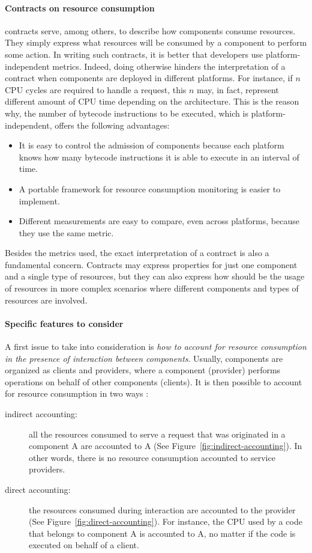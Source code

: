 \paragraph{Contracts on resource consumption}
 contracts serve, among others, to describe how components consume resources.
They simply express what resources will be consumed by a component to perform some action. 
In writing such contracts, it is better that developers use platform-independent metrics.
Indeed, doing otherwise hinders the interpretation of a contract when components are deployed in different platforms.
For instance, if $n$ CPU cycles are required to handle a request, this $n$ may, in fact, represent different amount of CPU time depending on the architecture.
This is the reason why, the number of bytecode instructions to be executed, which is platform-independent, offers the following advantages:
\begin{itemize}
\item It is easy to control the admission of components because each platform knows how many bytecode instructions it is able to execute in an interval of time.
\item A portable framework for resource consumption monitoring is easier to implement.
\item Different measurements are easy to compare, even across platforms, because they use the same metric.
\end{itemize}
Besides the metrics used, the exact interpretation of a contract is also a fundamental concern.
Contracts may express properties for just one component and a single type of resources, but they can also express how should be the usage of resources in more complex scenarios where different components and types of resources are involved.

\paragraph{Specific features to consider}
A first issue to take into consideration is \textit{how to account for resource consumption in the presence of interaction between components}.
Usually, components are organized as clients and providers, where a component (provider) performs operations on behalf of other components (clients).
It is then possible to account for resource consumption in two ways \cite{Miettinen2008,Maurel:2012:AME:2304736.2304763}:

\begin{description}

\item[indirect accounting:] all the resources consumed to serve a request that was originated in a component A are accounted to A (See Figure~\ref{fig:indirect-accounting}).
In other words, there is no resource consumption accounted to service providers.

\item[direct accounting:] the resources consumed during
interaction are accounted to the provider (See Figure~\ref{fig:direct-accounting}).
For instance, the CPU used by a code that belongs
to component A is accounted to A, no matter if the code is executed on behalf of a client.
\end{description}

